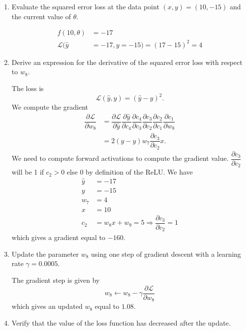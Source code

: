 \documentclass[11pt, a4paper]{article}
\begin{document}
\begin{enumerate}
    \begin{enumerate}
        \item Evaluate the squared error loss at the data point $(x, y) = (10, -15)$ and the current value of $\theta$.
        \begin{solution}
            \begin{align*}
                f(10, \theta) &= -17\\
            \mathcal{L}(\hat{y} &= -17, y=-15) = (17 - 15)^2 = 4    
            \end{align*}
        \end{solution}
        \item Derive an expression for the derivative of the squared error loss with respect to $w_8$.
        \begin{solution}
        The loss is
        $$
        \mathcal{L}(\hat{y}, y) = (\hat{y} - y)^2.
        $$
        We compute the gradient 
        \begin{align*}
            \dfrac{\partial \mathcal{L}}{\partial w_8} &= \dfrac{\partial \mathcal{L}}{\partial \hat{y}}\dfrac{\partial \hat{y}}{\partial c_4}\dfrac{\partial c_4}{\partial c_3}\dfrac{\partial c_3}{\partial c_2}\dfrac{\partial c_2}{\partial c_1}\dfrac{\partial c_1}{\partial w_8}\\
            &= 2(\hat{y} - y)w_7\dfrac{\partial c_3}{\partial c_2}x.
        \end{align*}
        We need to compute forward activations to compute the gradient value. $\dfrac{\partial c_3}{\partial c_2}$ will be 1 if $c_2 > 0$ else $0$ by definition of the ReLU. We have
        \begin{align*}
            \hat{y} &= -17\\
            y &= -15\\
            w_7 &= 4\\
            x &= 10\\
            c_2 &= w_8x + w_9 = 5 \Rightarrow \dfrac{\partial c_3}{\partial c_2} = 1
        \end{align*}
        which gives a gradient equal to $-160$.
        \end{solution}

        \item Update the parameter $w_8$ using one step of gradient descent with a learning rate $\gamma = 0.0005$.
        
        \begin{solution}
            The gradient step is given by
            $$
            w_8 \leftarrow w_8 - \gamma \dfrac{\partial \mathcal{L}}{\partial w_8}
            $$
            which gives an updated $w_8$ equal to $1.08$.
        \end{solution}
        \item Verify that the value of the loss function has decreased after the update.
        

\end{enumerate}
\end{enumerate}
\end{document}
